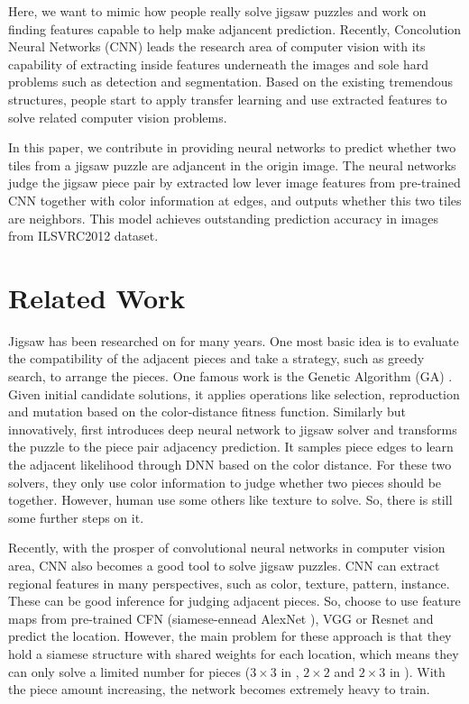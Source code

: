 \documentclass{article}
\begin{document}
Here, we want to mimic how people really solve jigsaw puzzles and work on finding features capable to help make adjancent prediction. Recently, Concolution Neural Networks (CNN) leads the research area of computer vision with its capability of extracting inside features underneath the images and sole hard problems such as detection\cite{redmon2017yolo9000} and segmentation\cite{he2017mask,yu2015multi}. Based on the existing tremendous structures, people start to apply transfer learning and use extracted features to solve related computer vision problems\cite{razavian2014cnn}.

In this paper, we contribute in providing neural networks to predict whether two tiles from a jigsaw puzzle are adjancent in the origin image. The neural networks judge the jigsaw piece pair by extracted low lever image features from pre-trained CNN together with color information at edges, and outputs whether this two tiles are neighbors. This model achieves outstanding prediction accuracy in images from ILSVRC2012 dataset\cite{ILSVRC15}.

\section{Related Work}

Jigsaw has been researched on for many years. One most basic idea is to evaluate the compatibility of the adjacent pieces and take a strategy, such as greedy search, to arrange the pieces. One famous work is the Genetic Algorithm (GA) \cite{sholomon2013genetic}. Given initial candidate solutions, it applies operations like selection, reproduction and mutation based on the color-distance fitness function. Similarly but innovatively, \cite{sholomon2016dnn} first introduces deep neural network to jigsaw solver and transforms the puzzle to the piece pair adjacency prediction. It samples piece edges to learn the adjacent likelihood through DNN based on the color distance. For these two solvers, they only use color information to judge whether two pieces should be together. However, human use some others like texture to solve. So, there is still some further steps on it.

Recently, with the prosper of convolutional neural networks in computer vision area, CNN also becomes a good tool to solve jigsaw puzzles. CNN can extract regional features in many perspectives, such as color, texture, pattern, instance. These can be good inference for judging adjacent pieces. So, \cite{deryneural,noroozi2016unsupervised} choose to use feature maps from pre-trained CFN \cite{noroozi2016unsupervised} (siamese-ennead AlexNet \cite{krizhevsky2012imagenet}), VGG \cite{he2016deep} or Resnet \cite{simonyan2014very} and predict the location. However, the main problem for these approach is that they hold a siamese structure with shared weights for each location, which means they can only solve a limited number for pieces ($3\times3$ in \cite{noroozi2016unsupervised}, $2\times2$ and $2\times3$ in \cite{deryneural}). With the piece amount increasing, the network becomes extremely heavy to train.
\end{document}
